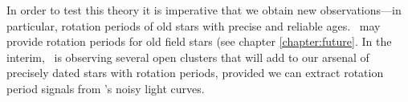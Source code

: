 In order to test this theory it is imperative that we obtain new
observations---in particular, rotation periods of old stars with precise and
reliable ages.
\LSST\ may provide rotation periods for old field stars (see chapter
\ref{chapter:future}.
In the interim, \ktwo\ is observing several open clusters that will add to our
arsenal of precisely dated stars with rotation periods, provided we can
extract rotation period signals from \ktwo's noisy light curves.


% 
% 

% 
